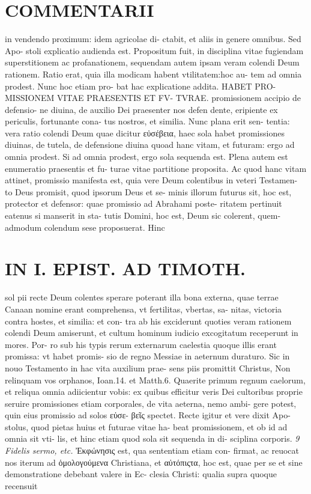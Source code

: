 \documentclass{article}
\begin{document}
\begin{pages}
\section*{COMMENTARII }
\marginpar{[ p.100 ]}\pstart in vendendo proximum: idem agricolae di- ctabit, et aliis in genere omnibus. Sed Apo- stoli explicatio audienda est. Propositum fuit, in disciplina vitae fugiendam superstitionem ac profanationem, sequendam autem ipsam veram colendi Deum rationem. Ratio erat, quia illa modicam habent vtilitatem:hoc au- tem ad omnia prodest. Nunc hoc etiam pro- bat hac explicatione addita. HABET PRO- MISSIONEM VITAE PRAESENTIS ET FV- TVRAE. promissionem accipio de defensio- ne diuina, de auxilio Dei praesenter nos defen dente, eripiente ex periculis, fortunante cona- tus nostros, et similia. Nunc plana erit sen- tentia: vera ratio colendi Deum quae dicitur εὐσέβεια, haec sola habet promissiones diuinas, de tutela, de defensione diuina quoad hanc vitam, et futuram: ergo ad omnia prodest. Si ad omnia prodest, ergo sola sequenda est. Plena autem est enumeratio praesentis et fu- turae vitae partitione proposita. Ac quod hanc vitam attinet, promissio manifesta est, quia vere Deum colentibus in veteri Testamen- to Deus promisit, quod ipsorum Deus et se- minis illorum futurus sit, hoc est, protector et defensor: quae promissio ad Abrahami poste- ritatem pertinuit eatenus si manserit in sta- tutis Domini, hoc est, Deum sic colerent, quem- admodum colendum sese proposuerat. Hinc  \pend
\section*{IN I. EPIST. AD TIMOTH. }
\marginpar{[ p.101 ]}\pstart sol pii recte Deum colentes sperare poterant illa bona externa, quae terrae Canaan nomine erant comprehensa, vt fertilitas, vbertas, sa- nitas, victoria contra hostes, et similia: et con- tra ab his exciderunt quoties veram rationem colendi Deum amiserunt, et cultum hominum iudicio excogitatum receperunt in mores. Por- ro sub his typis rerum externarum caelestia quoque illis erant promissa: vt habet promis- sio de regno Messiae in aeternum duraturo. Sic in nouo Testamento in hac vita auxilium prae- sens piis promittit Christus, Non relinquam vos orphanos, Ioan.14. et Matth.6. Quaerite primum regnum caelorum, et reliqua omnia adiicientur vobis: ex quibus efficitur veris Dei cultoribus proprie seruire promissiones etiam corporales, de vita aeterna, nemo ambi- gere potest, quin eius promissio ad solos εὐσε- βεῖς spectet. Recte igitur et vere dixit Apo- stolus, quod pietas huius et futurae vitae ha- beat promissionem, et ob id ad omnia sit vti- lis, et hinc etiam quod sola sit sequenda in di- sciplina corporis.  \pend
\textit{9 Fidelis sermo, etc. }\pstart Ἐκφώνησις est, qua sententiam etiam con- firmat, ac reuocat nos iterum ad ὁμολογούμενα Christiana, et αὐτόπιςτα, hoc est, quae per se et sine demonstratione debebant valere in Ec- clesia Christi: qualia supra quoque recensuit  \pend

\end{pages}
\end{document}
